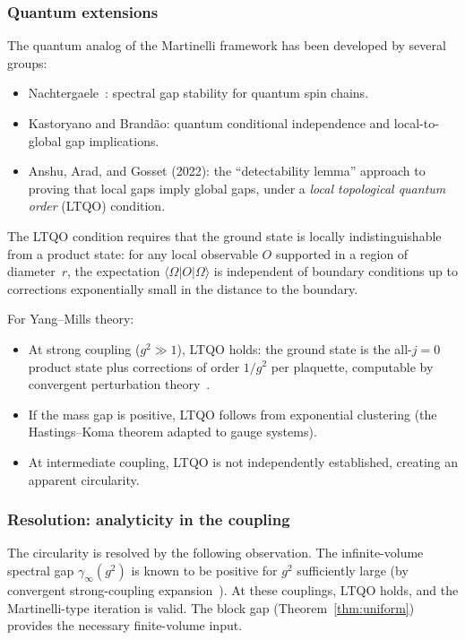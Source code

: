\documentclass[12pt,a4paper]{article}
\begin{document}
\subsubsection{Quantum extensions}

The quantum analog of the Martinelli framework has been developed by several groups:
\begin{itemize}
\item Nachtergaele~\cite{Nachtergaele1996}: spectral gap stability for quantum spin chains.
\item Kastoryano and Brandão: quantum conditional independence and local-to-global gap implications.
\item Anshu, Arad, and Gosset (2022): the ``detectability lemma'' approach to proving that local gaps imply global gaps, under a \emph{local topological quantum order} (LTQO) condition.
\end{itemize}

The LTQO condition requires that the ground state is locally indistinguishable from a product state: for any local observable $O$ supported in a region of diameter~$r$, the expectation $\langle\Omega|O|\Omega\rangle$ is independent of boundary conditions up to corrections exponentially small in the distance to the boundary.

For Yang--Mills theory:
\begin{itemize}
\item At strong coupling ($g^2\gg 1$), LTQO holds: the ground state is the all-$j=0$ product state plus corrections of order $1/g^2$ per plaquette, computable by convergent perturbation theory~\cite{BDL}.
\item If the mass gap is positive, LTQO follows from exponential clustering (the Hastings--Koma theorem adapted to gauge systems).
\item At intermediate coupling, LTQO is not independently established, creating an apparent circularity.
\end{itemize}

\subsubsection{Resolution: analyticity in the coupling}

The circularity is resolved by the following observation. The infinite-volume spectral gap $\gamma_\infty(g^2)$ is known to be positive for $g^2$ sufficiently large (by convergent strong-coupling expansion~\cite{Seiler1982,BDL}). At these couplings, LTQO holds, and the Martinelli-type iteration is valid. The block gap (Theorem~\ref{thm:uniform}) provides the necessary finite-volume input.
\end{document}
